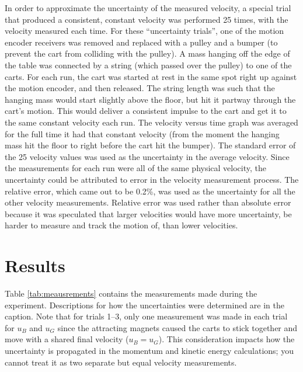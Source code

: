 \documentclass[12pt]{iopart} %
\begin{document}
In order to approximate the uncertainty of the measured velocity, a special trial that produced a consistent, constant velocity was performed 25 times, with the velocity measured each time.
For these ``uncertainty trials'', one of the motion encoder receivers was removed and replaced with a pulley and a bumper (to prevent the cart from colliding with the pulley).
A mass hanging off the edge of the table was connected by a string (which passed over the pulley) to one of the carts.
For each run, the cart was started at rest in the same spot right up against the motion encoder, and then released.
The string length was such that the hanging mass would start slightly above the floor, but hit it partway through the cart's motion.
This would deliver a consistent impulse to the cart and get it to the same constant velocity each run.
The velocity versus time graph was averaged for the full time it had that constant velocity (from the moment the hanging mass hit the floor to right before the cart hit the bumper).
The standard error of the 25 velocity values was used as the uncertainty in the average velocity.
Since the measurements for each run were all of the same physical velocity, the uncertainty could be attributed to error in the velocity measurement process.
The relative error, which came out to be 0.2\%, was used as the uncertainty for all the other velocity measurements.
Relative error was used rather than absolute error because it was speculated that larger velocities would have more uncertainty, be harder to measure and track the motion of, than lower velocities.


\section{Results}

Table \ref{tab:meausrements} contains the measurements made during the experiment.
Descriptions for how the uncertainties were determined are in the caption.
Note that for trials 1--3, only one measurement was made in each trial for $u_B$ and $u_G$ since the attracting magnets caused the carts to stick together and move with a shared final velocity ($u_B = u_G$).
This consideration impacts how the uncertainty is propagated in the momentum and kinetic energy calculations; you cannot treat it as two separate but equal velocity measurements.
\end{document}
